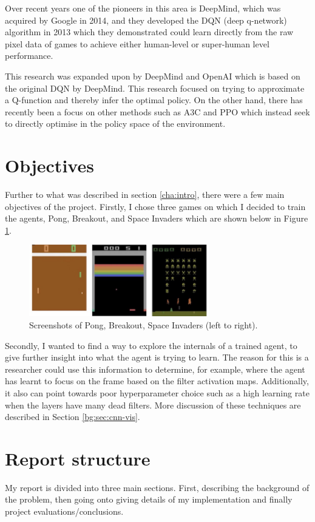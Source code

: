Over recent years one of the pioneers in this area is DeepMind, which was acquired by Google in 2014, and they developed the DQN (deep q-network) algorithm in 2013 which they demonstrated could learn directly from the raw pixel data of games to achieve either human-level or super-human level performance.

This research was expanded upon by DeepMind and OpenAI which is based on the original DQN by DeepMind. This research focused on trying to approximate a Q-function and thereby infer the optimal policy. On the other hand, there has recently been a focus on other methods such as A3C and PPO which instead seek to directly optimise in the policy space of the environment.

\section{Objectives}
\label{intro:sec:obj}
Further to what was described in section \ref{cha:intro}, there were a few main objectives of the project. Firstly, I chose three games on which I decided to train the agents, Pong, Breakout, and Space Invaders which are shown below in Figure \ref{fig:atari-screenshot}.

\begin{figure}[htbp]
	\centering
	\includegraphics[width=0.7\textwidth]{chapters/chapter1/images/atari-combined.jpg}
	\caption{Screenshots of Pong, Breakout, Space Invaders (left to right).
		\label{fig:atari-screenshot}
	}
\end{figure}


Secondly, I wanted to find a way to explore the internals of a trained agent, to give further insight into what the agent is trying to learn. The reason for this is a researcher could use this information to determine, for example, where the agent has learnt to focus on the frame based on the filter activation maps. Additionally, it also can point towards poor hyperparameter choice such as a high learning rate when the layers have many dead filters. More discussion of these techniques are described in Section \ref{bg:sec:cnn-vis}.

\section{Report structure}
\label{intro:sec:report_struc}

My report is divided into three main sections. First, describing the background of the problem, then going onto giving details of my implementation and finally project evaluations/conclusions.